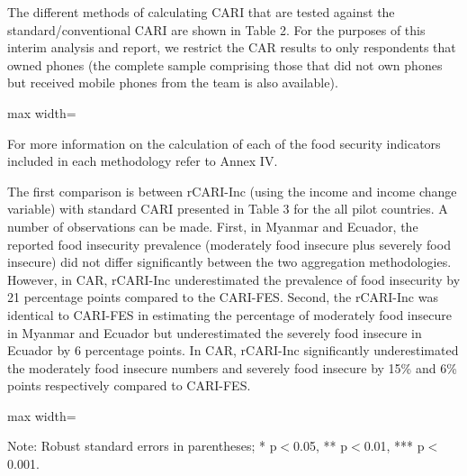 \documentclass[11pt,harvard]{article}
\begin{document}
The different methods of calculating CARI that are tested against the standard/conventional CARI are shown in Table 2. For the purposes of this interim analysis and report, we restrict the CAR results to only respondents that owned phones (the complete sample comprising those that did not own phones but received mobile phones from the team is also available).  


\begin{table}[htbp]
	\centering
	\begin{adjustbox}{max width=\textwidth}
		\begin{threeparttable}
			\caption{Lists the different aggregation methods and indicators used for each methodology}
			\scriptsize
			 
			\label{tab:Aggregation_Table}
		\end{threeparttable}
	\end{adjustbox}
\end{table}
 
 For more information on the calculation of each of the food security indicators included in each methodology refer to Annex IV. 
 
The first comparison is between rCARI-Inc (using the income and income change variable) with standard CARI presented in Table 3 for the all pilot countries. A number of observations can be made. First, in Myanmar and Ecuador, the reported food insecurity prevalence (moderately food insecure plus severely food insecure) did not differ significantly between the two aggregation methodologies. However, in CAR, rCARI-Inc underestimated the prevalence of food insecurity by 21 percentage points compared to the CARI-FES. Second, the rCARI-Inc was identical to CARI-FES in estimating the percentage of moderately food insecure in Myanmar and Ecuador but underestimated the severely food insecure in Ecuador by 6 percentage points. In CAR, rCARI-Inc significantly underestimated the moderately food insecure numbers and severely food insecure by 15\% and 6\% points respectively compared to CARI-FES.
 
\begin{table}[htbp]
	\centering
	\begin{adjustbox}{max width=\textwidth}
		\begin{threeparttable}
			\caption{Impact of Survey Modality: Standard CARI-FES vs. Standard rCARI-Inc}
			\scriptsize
			 
			\label{tab:CARI_rCARI_Modality_All_Country}
			\begin{tablenotes}
				\item Note: Robust standard errors in parentheses; * p$<$0.05, ** p$<$0.01, *** p$<$0.001. 
			\end{tablenotes}
		\end{threeparttable}
	\end{adjustbox}
\end{table}
\end{document}
